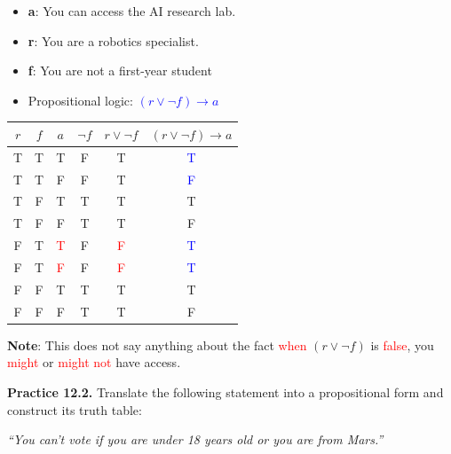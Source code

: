 \documentclass[aspectratio=169]{beamer}
\providecommand{\Blue}[1]{\textcolor{blue}{#1}}
\providecommand{\Red}[1]{\textcolor{red}{#1}}
\begin{document}
\begin{frame}[plain]{}

\begin{itemize}
     \item {\bf a}: You can access the AI research lab. %
     \item {\bf r}: You are a robotics specialist.
     \item {\bf f}: You are not a first-year student
     \item Propositional logic: \Blue{$(r\vee \neg f)\rightarrow a$}
\end{itemize}
  
         \begin{center}
        \begin{tabular}{|c|c|c|c|c|c|}\hline
          $r$ & $f$ & $a$ & $\neg f$ & $r\vee\neg f$ &  $(r\vee \neg f)\rightarrow a$ \\ \hline
            T  &  T  & T & F & T & \Blue{T}\\ \hline
            T  &  T  & F & F & T & \Blue{F}\\ \hline 
            T  &  F  & T & T & T & T\\ \hline
            T  &  F  & F & T & T & F\\ \hline
            F  &  T  & \Red{T} & F & \Red{F} & \Blue{T}\\ \hline
            F  &  T  & \Red{F} & F & \Red{F} & \Blue{T}\\ \hline
            F  &  F  & T & T & T & T\\ \hline
            F  &  F  & F & T & T & F\\ \hline
        \end{tabular}
	\end{center}\pause
	
{\bf Note}: This does not say anything about the fact \Red{when}
      $(r\vee \neg f)$ is \Red{false}, you \Red{might} or \Red{might not} have access.
      
\end{frame}

\begin{frame}[plain]{}

{\bf Practice 12.2.}
Translate the following statement into a propositional form and construct 
 its truth table:
   \smallskip
   
    \emph{
      ``You can't vote if you are under 18 years old or you are from Mars.''}
  
  \vspace{1.5in}
  
\end{frame}
\end{document}
